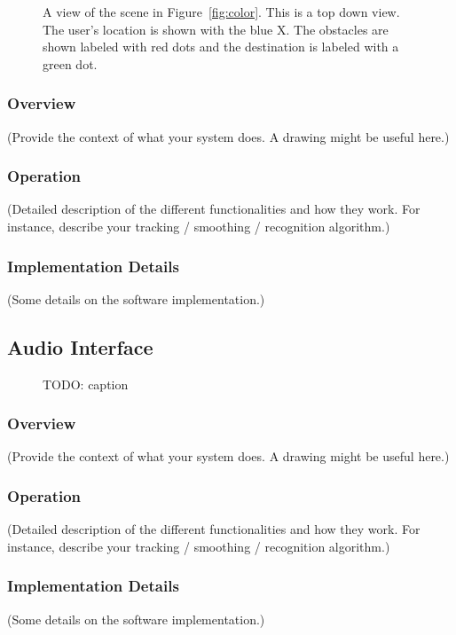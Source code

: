 \begin{figure}
\caption{A view of the scene in Figure~\ref{fig:color}. This is a top down view.
  The user's location is shown with the blue X. The obstacles are shown labeled
  with red dots and the destination is labeled with a green dot.}
\label{fig:obstacle}
\end{figure}

\subsubsection{Overview}
\label{sec:obs-overview}

(Provide the context of what your system does. A drawing might be useful here.)

\subsubsection{Operation}
\label{sec:obs-op}

(Detailed description of the different functionalities and how they work. For
instance, describe your tracking / smoothing / recognition algorithm.)

\subsubsection{Implementation Details}
\label{sec:pbs-impl}

(Some details on the software implementation.)

\subsection{Audio Interface}
\label{sec:audio}

\begin{figure}
\caption{TODO: caption}
\label{fig:vsim}
\end{figure}

\subsubsection{Overview}
\label{sec:audio-overview}

(Provide the context of what your system does. A drawing might be useful here.)

\subsubsection{Operation}
\label{sec:audio-op}

(Detailed description of the different functionalities and how they work. For
instance, describe your tracking / smoothing / recognition algorithm.)

\subsubsection{Implementation Details}
\label{sec:audio-impl}

(Some details on the software implementation.)
